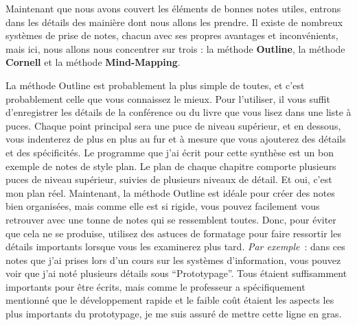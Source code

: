 Maintenant que nous avons couvert les éléments de bonnes notes utiles,
entrons dans les détails des mainière dont nous allons les prendre. Il
existe de nombreux systèmes de prise de notes, chacun avec ses propres
avantages et inconvénients, mais ici, nous allons nous concentrer sur
trois : la méthode \textbf{Outline}, la méthode \textbf{Cornell} et la
méthode \textbf{Mind-Mapping}.

La méthode Outline est probablement la plus simple de toutes, et c'est
probablement celle que vous connaissez le mieux. Pour l'utiliser, il
vous suffit d'enregistrer les détails de la conférence ou du livre que
vous lisez dans une liste à puces. Chaque point principal sera une puce
de niveau supérieur, et en dessous, vous indenterez de plus en plus au
fur et à mesure que vous ajouterez des détails et des spécificités. Le
programme que j'ai écrit pour cette synthèse est un bon exemple de notes
de style plan. Le plan de chaque chapitre comporte plusieurs puces de
niveau supérieur, suivies de plusieurs niveaux de détail. Et oui, c'est
mon plan réel. Maintenant, la méthode Outline est idéale pour créer des
notes bien organisées, mais comme elle est si rigide, vous pouvez
facilement vous retrouver avec une tonne de notes qui se ressemblent
toutes. Donc, pour éviter que cela ne se produise, utilisez des astuces
de formatage pour faire ressortir les détails importants lorsque vous
les examinerez plus tard. \emph{Par exemple}~: dans ces notes que j'ai
prises lors d'un cours sur les systèmes d'information, vous pouvez voir
que j'ai noté plusieurs détails sous ``Prototypage''. Tous étaient
suffisamment importants pour être écrits, mais comme le professeur a
spécifiquement mentionné que le développement rapide et le faible coût
étaient les aspects les plus importants du prototypage, je me suis
assuré de mettre cette ligne en gras.

